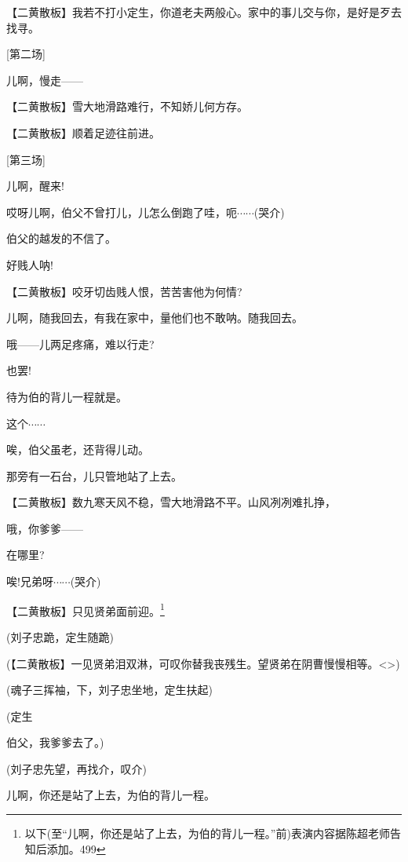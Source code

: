 \setlength{\hangindent}{60pt} {【{\akai 二黄散板}】我若不打小定生，你道老夫两般心。家中的事儿交与你，是好是歹去找寻。}

{{[}第二场{]}}

{儿啊，慢走------}

\setlength{\hangindent}{60pt} {【{\akai 二黄散板}】雪大地滑路难行，不知娇儿何方存。}

\setlength{\hangindent}{60pt} {【{\akai 二黄散板}】顺着足迹往前进。}

{{[}第三场{]}}

{儿啊，醒来!}

{哎呀儿啊，伯父不曾打儿，儿怎么倒跑了哇，呃$\cdots{}\cdots{}$(哭介)}

{伯父的越发的不信了。}

{好贱人呐!}

\setlength{\hangindent}{60pt} {【{\akai 二黄散板}】咬牙切齿贱人恨，苦苦害他为何情?}

{儿啊，随我回去，有我在家中，量他们也不敢呐。随我回去。}

{哦------儿两足疼痛，难以行走?}

{也罢!}

{待为伯的背儿一程就是。}

{这个$\cdots{}\cdots{}$}

{唉，伯父虽老，还背得儿动。}

{那旁有一石台，儿只管地站了上去。}

\setlength{\hangindent}{60pt} {【{\akai 二黄散板}】数九寒天风不稳，雪大地滑路不平。山风冽冽难扎挣，}

{哦，你爹爹------}

{在哪里?}

{唉!兄弟呀$\cdots{}\cdots{}$(哭介)}

\setlength{\hangindent}{60pt} {【{\akai 二黄散板}】只见贤弟面前迎。}\footnote{ 以下(至``{儿啊，你还是站了上去，为伯的背儿一程。''前})表演内容据陈超老师告知后添加。{499}}

{(}刘子忠跪，定生随跪{)}

{(【{\akai 二黄散板}】}一见贤弟泪双淋，可叹你替我丧残生。望贤弟在阴曹慢慢相等。\textless{}\!\textgreater{}{)}

{(}魂子三挥袖，下，刘子忠坐地，定生扶起{)}

{(}定生\hspace{20pt}~

伯父，我爹爹去了。{)}

{(}刘子忠先望，再找介，叹介{)}

{儿啊，你还是站了上去，为伯的背儿一程。}

